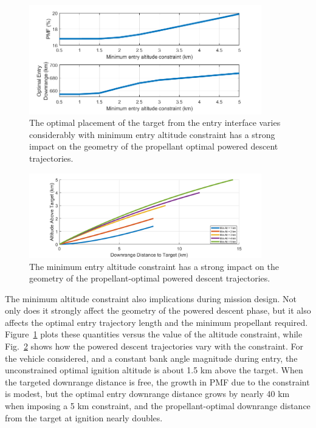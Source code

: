 \documentclass[letterpaper, paper,11pt]{AAS}
\begin{document}
\begin{figure}[h!]
	\centering
	\includegraphics[width=0.9\textwidth]{min_alt_constraint} 
	\caption{The optimal placement of the target from the entry interface varies considerably with minimum entry altitude constraint has a strong impact on the geometry of the propellant optimal powered descent trajectories.}
	\label{fig_min_alt_constraint}
\end{figure} 
\begin{figure}[h!]
	\centering
	\includegraphics[width=0.9\textwidth]{SRP_vs_min_alt} 
	\caption{The minimum entry altitude constraint has a strong impact on the geometry of the propellant-optimal powered descent trajectories.}
	\label{fig_srp_traj}
\end{figure} 
 
The minimum altitude constraint also implications during mission design. Not only does it strongly affect the geometry of the powered descent phase, but it also affects the optimal entry trajectory length and the minimum propellant required.
 Figure~\ref{fig_min_alt_constraint} plots these quantities versus the value of the altitude constraint, while Fig.~\ref{fig_srp_traj} shows how the powered descent trajectories vary with the constraint. 
For the vehicle considered, and a constant bank angle magnitude during entry, the unconstrained optimal ignition altitude is about 1.5 km above the target. When the targeted downrange distance is free, the growth in PMF due to the constraint is modest, but the optimal entry downrange distance grows by nearly 40 km when imposing a 5 km constraint, and the propellant-optimal downrange distance from the target at ignition nearly doubles. 
 
\end{document}
